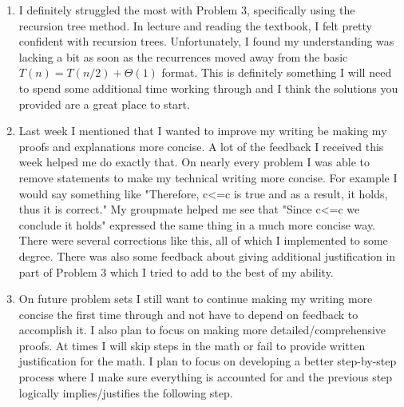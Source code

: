 \documentclass[11pt]{article}
\theoremstyle{nonumberplain}
\begin{document}
\begin{enumerate}
\item I definitely struggled the most with Problem 3, specifically using the recursion tree method. In lecture and reading the textbook, I felt pretty confident with recursion trees. Unfortunately, I found my understanding was lacking a bit as soon as the recurrences moved away from the basic $T(n)=T(n/2)+ \Theta(1)$ format. This is definitely something I will need to spend some additional time working through and I think the solutions you provided are a great place to start.
\item Last week I mentioned that I wanted to improve my writing be making my proofs and explanations more concise. A lot of the feedback I received this week helped me do exactly that. On nearly every problem I was able to remove statements to make my technical writing more concise. For example I would say something like "Therefore, c<=c is true and as a result, it holds, thus it is correct." My groupmate helped me see that "Since c<=c we conclude it holds" expressed the same thing in a much more concise way. There were several corrections like this, all of which I implemented to some degree. There was also some feedback about giving additional justification in part of Problem 3 which I tried to add to the best of my ability.
\item On future problem sets I still want to continue making my writing more concise the first time through and not have to depend on feedback to accomplish it. I also plan to focus on making more detailed/comprehensive proofs. At times I will skip steps in the math or fail to provide written justification for the math. I plan to focus on developing a better step-by-step process where I make sure everything is accounted for and the previous step logically implies/justifies the following step.    
\end{enumerate}


\end{document}
